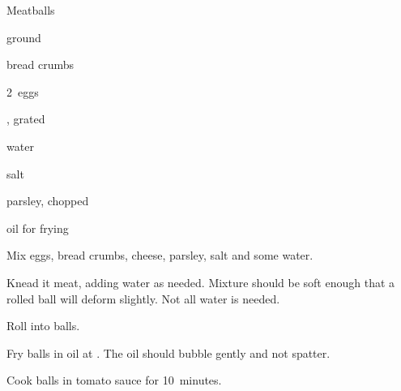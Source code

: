 \begin{recipe}{Meatballs}{}{}

\begin{ingredients}
\item {} ground 
\item {} bread crumbs
\item 2~eggs
\item {} , grated
\item {} water
\item {} salt
\item parsley, chopped
\item oil for frying
\item {}
\end{ingredients}

\begin{directions}
\item Mix eggs, bread crumbs, cheese, parsley, salt and some water.
\item Knead it meat, adding water as needed. Mixture should be soft enough that a rolled ball will deform slightly. Not all water is needed.
\item Roll into balls.
\item Fry balls in oil at . The oil should bubble gently and not spatter.
\item Cook balls in tomato sauce for 10~minutes.
\end{directions}

\end{recipe}
